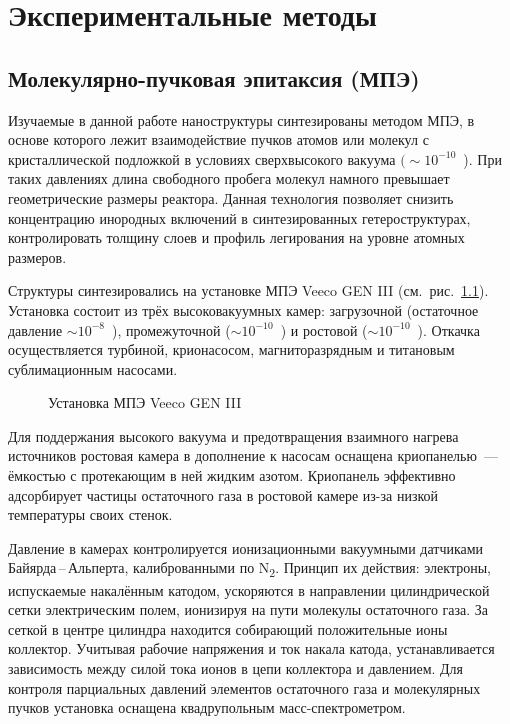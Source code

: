 \chapter{Экспериментальные методы}\label{ch:ch2}

\section{Молекулярно-пучковая эпитаксия (МПЭ)}\label{sec:ch2/sec1}

Изучаемые в данной работе наноструктуры синтезированы методом МПЭ, в основе
которого лежит взаимодействие пучков атомов или молекул с кристаллической
подложкой в условиях сверхвысокого вакуума \((\sim 10^{-10}\)~\si{\torr}). При
таких давлениях длина свободного пробега молекул намного превышает
геометрические размеры реактора. Данная технология позволяет снизить
концентрацию инородных включений в синтезированных гетероструктурах,
контролировать толщину слоев и профиль легирования на уровне атомных размеров.

Структуры синтезировались на установке МПЭ Veeco GEN III
(см.~рис.~\cref{fig:Image_10}). Установка состоит из трёх высоковакуумных
камер: загрузочной (остаточное давление \(\sim 10^{-8}\)~\si{\torr}),
промежуточной (\(\sim 10^{-10}\)~\si{\torr}) и ростовой (\(\sim
10^{-10}\)~\si{\torr}). Откачка осуществляется турбиной, крионасосом,
магниторазрядным и титановым сублимационным насосами.

\begin{figure}[ht]  \caption{Установка МПЭ Veeco
GEN III}\label{fig:Image_10} \end{figure}

Для поддержания высокого вакуума и предотвращения взаимного нагрева источников
ростовая камера в дополнение к насосам оснащена криопанелью~--- ёмкостью с
протекающим в ней жидким азотом. Криопанель эффективно адсорбирует частицы
остаточного газа в ростовой камере из-за низкой температуры своих стенок.

Давление в камерах контролируется ионизационными вакуумными датчиками
Байярда\,--\,Альперта, калиброванными по N\textsubscript{2}. Принцип их
действия: электроны, испускаемые накалённым катодом, ускоряются в направлении
цилиндрической сетки электрическим полем, ионизируя на пути молекулы
остаточного газа. За сеткой в центре цилиндра находится собирающий
положительные ионы коллектор. Учитывая рабочие напряжения и ток накала катода,
устанавливается зависимость между силой тока ионов в цепи коллектора и
давлением. Для контроля парциальных давлений элементов остаточного газа и
молекулярных пучков установка оснащена квадрупольным масс-спектрометром.

